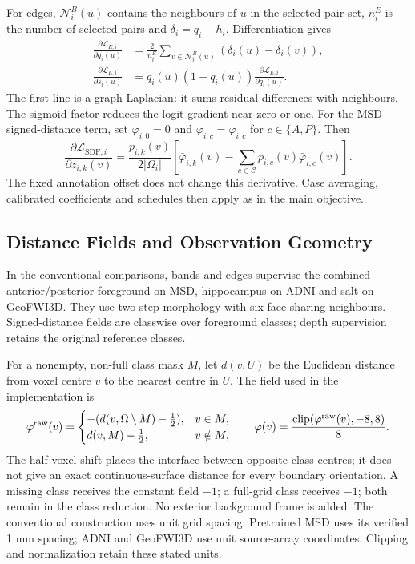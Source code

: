 \documentclass[12pt,a4paper]{article}
\begin{document}
For edges, $\mathcal N_i^B(u)$ contains the neighbours of $u$ in the
selected pair set, $n_i^E$ is the number of selected pairs and
$\delta_i=q_i-h_i$. Differentiation gives
\begin{equation}
\begin{aligned}
\frac{\partial\mathcal L_{E,i}}{\partial q_i(u)}
 &=\frac{2}{n_i^E}\sum_{v\in\mathcal N_i^B(u)}
     (\delta_i(u)-\delta_i(v)),\\
\frac{\partial\mathcal L_{E,i}}{\partial s_i(u)}
 &=q_i(u)(1-q_i(u))\frac{\partial\mathcal L_{E,i}}{\partial q_i(u)}.
\end{aligned}\label{eq:edge-logit-gradient}
\end{equation}
The first line is a graph Laplacian: it sums residual differences with
neighbours. The sigmoid factor reduces the logit gradient near zero or
one. For the MSD signed-distance term, set $\bar\varphi_{i,0}=0$ and
$\bar\varphi_{i,c}=\varphi_{i,c}$ for $c\in\{A,P\}$. Then
\begin{equation}
\frac{\partial\mathcal L_{\mathrm{SDF},i}}{\partial z_{i,k}(v)}
=\frac{p_{i,k}(v)}{2|\Omega_i|}
 \left[\bar\varphi_{i,k}(v)-\sum_{c\in\mathcal C}
 p_{i,c}(v)\bar\varphi_{i,c}(v)\right].
\label{eq:sdf-logit-gradient}
\end{equation}
The fixed annotation offset does not change this derivative. Case
averaging, calibrated coefficients and schedules then apply as in the
main objective.

\subsection{Distance Fields and Observation Geometry}
\label{sec:sdf-construction-details}

In the conventional comparisons, bands and edges supervise the combined
anterior/posterior foreground on MSD, hippocampus on ADNI and salt on
GeoFWI3D. They use two-step morphology with six face-sharing neighbours.
Signed-distance fields are classwise over foreground classes; depth
supervision retains the original reference classes.

For a nonempty, non-full class mask $M$, let $d(v,U)$ be the Euclidean
distance from voxel centre $v$ to the nearest centre in $U$. The field
used in the implementation is
\begin{equation}
\varphi^{\rm raw}(v)=
\begin{cases}
-(d(v,\Omega\setminus M)-\tfrac12), & v\in M,\\
d(v,M)-\tfrac12, & v\notin M,
\end{cases}
\qquad
\varphi(v)=\frac{\operatorname{clip}(\varphi^{\rm raw}(v),-8,8)}{8}.
\label{eq:sdf-half-voxel-field}
\end{equation}
The half-voxel shift places the interface between opposite-class
centres; it does not give an exact continuous-surface distance for every
boundary orientation. A missing class receives the constant field $+1$;
a full-grid class receives $-1$; both remain in the class reduction.
No exterior background frame is added. The conventional construction uses unit grid
spacing. Pretrained MSD uses its verified 1 mm spacing; ADNI and
GeoFWI3D use unit source-array coordinates. Clipping and normalization
retain these stated units.
\end{document}
